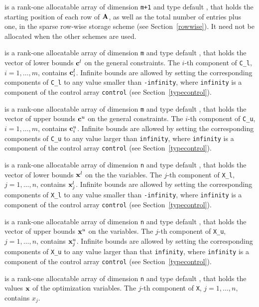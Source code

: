 \documentclass{galahad}
\begin{document}
\begin{description}
\begin{description}
 is a rank-one allocatable array of dimension {\tt m+1} and type 
default \integer, that holds the 
starting position of each row of ${\mathbf{A}}$, as well
as the total number of entries plus one, in the sparse row-wise storage
scheme (see Section~\ref{rowwise}). It need not be allocated when the
other schemes are used.

\end{description}

 is a rank-one allocatable array of dimension {\tt m} and type 
default \realdp, that holds the vector of lower bounds ${\mathbf{c}}^{l}$ 
on the general constraints. The $i$-th component of 
{\tt C\_l}, $i = 1, \ldots , m$, contains ${\mathbf{c}}_{i}^{l}$.
Infinite bounds are allowed by setting the corresponding 
components of {\tt C\_l} to any value smaller than {\tt -infinity}, 
where {\tt infinity} is a component of the control array {\tt control} 
(see Section~\ref{typecontrol}).

 is a rank-one allocatable array of dimension {\tt m} and type 
default \realdp, that holds the vector of upper bounds ${\mathbf{c}}^{u}$ 
on the general constraints. The $i$-th component of 
{\tt C\_u}, $i = 1,  \ldots ,  m$, contains ${\mathbf{c}}_{i}^{u}$.
Infinite bounds are allowed by setting the corresponding 
components of {\tt C\_u} to any value larger than {\tt infinity}, 
where {\tt infinity} is a component of the control array {\tt control} 
(see Section~\ref{typecontrol}).

 is a rank-one allocatable array of dimension {\tt n} and type 
default \realdp, that holds
the vector of lower bounds ${\mathbf{x}}^{l}$ on the the variables.
The $j$-th component of {\tt X\_l}, $j = 1, \ldots , n$, 
contains ${\mathbf{x}}_{j}^{l}$.
Infinite bounds are allowed by setting the corresponding 
components of {\tt X\_l} to any value smaller than {\tt -infinity}, 
where {\tt infinity} is a component of the control array {\tt control} 
(see Section~\ref{typecontrol}).

 is a rank-one allocatable array of dimension {\tt n} and type 
default \realdp, that holds
the vector of upper bounds ${\mathbf{x}}^{u}$ on the variables.
The $j$-th component of {\tt X\_u}, $j = 1, \ldots , n$, 
contains ${\mathbf{x}}_{j}^{u}$.
Infinite bounds are allowed by setting the corresponding 
components of {\tt X\_u} to any value larger than that {\tt infinity}, 
where {\tt infinity} is a component of the control array {\tt control} 
(see Section~\ref{typecontrol}).

 is a rank-one allocatable array of dimension {\tt n} and type 
default \realdp, 
that holds the values ${\mathbf{x}}$ of the optimization variables.
The $j$-th component of {\tt X}, $j = 1,  \ldots , n$, contains $x_{j}$.  


\end{description}
\end{document}
